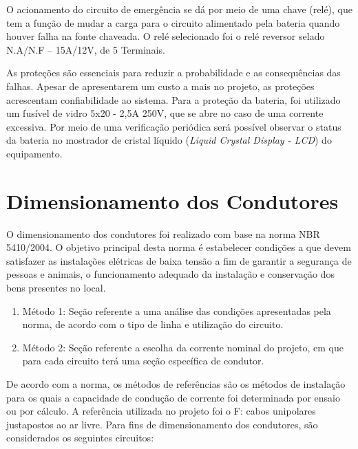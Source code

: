 O acionamento do circuito de emergência se dá por meio de uma chave (relé), que tem a função de mudar a carga para o circuito alimentado pela bateria quando houver falha na fonte chaveada. O relé selecionado foi o relé reversor selado N.A/N.F – 15A/12V, de 5 Terminais.

As proteções são essenciais para reduzir a probabilidade e as consequências das falhas. Apesar de apresentarem um custo a mais no projeto, as proteções acrescentam confiabilidade ao sistema. Para a proteção da bateria, foi utilizado um fusível de vidro 5x20 - 2,5A 250V, que se abre no caso de uma corrente excessiva. Por meio de uma verificação periódica será possível observar o status da bateria no mostrador de cristal líquido (\textit{Liquid Crystal Display - LCD}) do equipamento.

\section{Dimensionamento dos Condutores}


O dimensionamento dos condutores foi realizado com base na norma NBR 5410/2004. O objetivo principal desta norma é estabelecer condições a que devem satisfazer as instalações elétricas de baixa tensão a fim de garantir a segurança de pessoas e animais, o funcionamento adequado da instalação e conservação dos bens presentes no local. 

\begin{enumerate}
    \item Método 1: Seção referente a uma análise das condições apresentadas pela norma, de acordo com o tipo de linha e utilização do circuito. 
    
    \item Método 2: Seção referente a escolha da corrente nominal do projeto, em que para cada circuito terá uma seção específica de condutor. 
\end{enumerate}

De acordo com a norma, os métodos de referências são os métodos de instalação para os quais a capacidade de condução de corrente foi determinada por ensaio ou por cálculo. A referência utilizada no projeto foi o F: cabos unipolares justapostos ao ar livre. Para fins de dimensionamento dos condutores, são considerados os seguintes circuitos:

